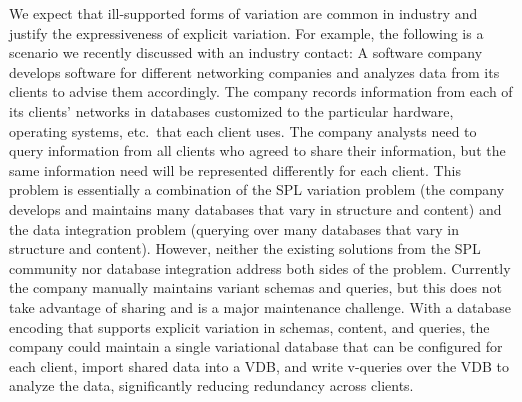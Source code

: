 We expect that ill-supported forms of variation are common in industry and
justify the expressiveness of explicit variation. For example, the following is
a scenario we recently discussed with an industry contact:
%
A software company develops software for different networking companies and
analyzes data from its clients to advise them accordingly. 
%
The company records information from each of its clients' networks in databases
customized to the particular hardware, operating systems, etc.\ that each
client uses.
%
The company analysts need to query information from all clients who agreed to
share their information, but the same information need will be represented
differently for each client.
%
This problem is essentially a combination of the SPL variation problem (the
company develops and maintains many databases that vary in structure and
content) and the data integration problem (querying over many databases that
vary in structure and content). However, neither the existing solutions from
the SPL community nor database integration address both sides of the problem.
%
Currently the company manually maintains variant schemas and queries, but this
does not take advantage of sharing and is a major maintenance challenge.
%
With a database encoding that supports explicit variation in schemas, content,
and queries, the company could maintain a single variational database that can
be configured for each client, import shared data into a VDB, and write
v-queries over the VDB to analyze the data, significantly reducing redundancy
across clients.
%



